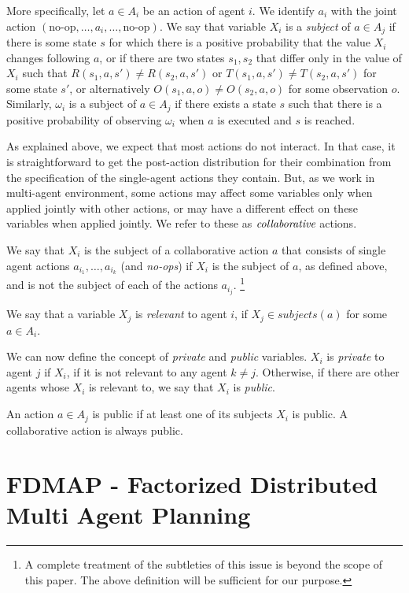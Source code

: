 \documentclass[letterpaper]{article} %
\begin{document}
More specifically, let $a\in A_i$ be an action of agent $i$. We identify $a_i$ with the joint action $(\mbox{no-op},\ldots, a_i,\ldots,\mbox{no-op})$.
We say that variable $X_i$ is a {\em subject} of $a\in A_j$ if there is some state $s$ for which there is a positive probability that the value 
$X_i$ changes following $a$, or if there are two states $s_1,s_2$ that differ only in the value of $X_i$ such that $R(s_1,a,s')\neq R(s_2,a,s')$ or $T(s_1,a,s')\neq T(s_2,a,s')$ for some state $s'$, or alternatively $O(s_1,a,o)\neq O(s_2,a,o)$ for some observation $o$.
Similarly, $\omega_i$ is a subject of $a\in A_j$ if there exists a state $s$ such that there is a positive probability
of observing $\omega_i$ when $a$ is executed and $s$ is reached.

As explained above, we expect that most actions do not interact. In that case, it is straightforward to get the post-action distribution for their combination from the specification of the single-agent actions they contain. But, as we work in multi-agent environment, some actions may affect some variables only when applied jointly with other actions, or may have a different effect on these variables when applied jointly.
We refer to these as $\emph{collaborative}$ actions. 

We say that $X_i$ is the subject of a collaborative action $a$ that consists of single agent actions
$a_{i_1},\ldots,a_{i_k}$ (and {\em no-ops}) if $X_i$ is the subject of $a$, as defined above, and is not the subject of each of the actions $a_{i_j}$.%
\footnote{A complete treatment of the subtleties of this issue is beyond the scope of this paper. The above definition will be sufficient for our purpose.}

We say that a variable $X_j$ is \emph{relevant} to agent $i$, if  $X_j\in subjects(a)$ for some $a\in A_i$.

We can now define the concept of {\em private} and {\em public} variables.
$X_i$ is {\em private} to agent $j$ if $X_i$, if it is not relevant to any agent $k\neq j$.
Otherwise, if there are other agents whose $X_i$ is relevant to, we say that $X_i$ is {\em public}. 

An action $a\in A_j$ is public if at least one of its subjects $X_i$ is public. A collaborative action is always public.

\section{FDMAP - Factorized Distributed Multi Agent Planning}
\end{document}
